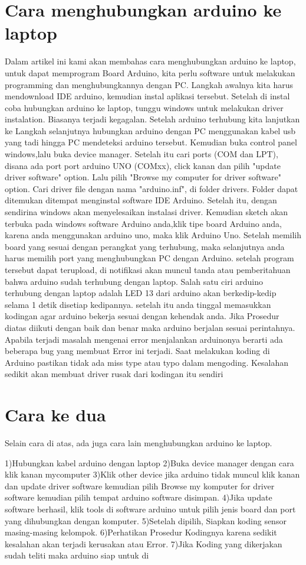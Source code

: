 \section{Cara menghubungkan arduino ke laptop}
Dalam artikel ini kami akan membahas cara menghubungkan arduino ke laptop, untuk dapat memprogram Board Arduino, kita perlu software untuk melakukan programming dan menghubungkannya dengan PC. Langkah awalnya kita harus mendownload IDE arduino, kemudian instal aplikasi tersebut. Setelah di instal coba hubungkan arduino ke laptop, tunggu windows untuk melakukan driver instalation. Biasanya terjadi kegagalan.
Setelah arduino terhubung kita lanjutkan ke Langkah selanjutnya hubungkan arduino dengan PC menggunakan kabel usb yang tadi hingga PC mendeteksi arduino tersebut. Kemudian buka control panel windows,lalu buka device manager. Setelah itu cari ports (COM dan LPT), disana ada port port arduino UNO (COMxx), click kanan dan pilih "update driver software" option.
Lalu pilih "Browse my computer for driver software" option. Cari driver file dengan nama "arduino.inf", di folder drivers. Folder dapat ditemukan ditempat menginstal software IDE Arduino.
Setelah itu, dengan sendirina windows akan menyelesaikan instalasi driver. Kemudian sketch akan terbuka pada windows software Arduino anda,klik tipe board Arduino anda, karena anda menggunakan arduino uno, maka klik Arduino Uno.
Setelah memilih board yang sesuai dengan perangkat yang terhubung, maka selanjutnya anda harus memilih port yang menghubungkan PC dengan Arduino.
setelah program tersebut dapat terupload, di notifikasi akan muncul tanda atau pemberitahuan bahwa arduino sudah terhubung dengan laptop. Salah satu ciri arduino terhubung dengan laptop adalah LED 13 dari arduino akan berkedip-kedip selama 1 detik disetiap kedipannya.
setelah itu anda tinggal memasukkan kodingan agar arduino bekerja sesuai dengan kehendak anda.
Jika Prosedur diatas diikuti dengan baik dan benar maka arduino berjalan sesuai perintahnya.
Apabila terjadi masalah mengenai error menjalankan arduinonya berarti ada beberapa bug yang membuat Error ini terjadi.
Saat melakukan koding di Arduino pastikan tidak ada miss type atau typo dalam mengoding. Kesalahan sedikit akan membuat driver rusak dari kodingan itu sendiri
\section{Cara ke dua}
Selain cara di atas, ada juga cara lain menghubungkan arduino ke laptop.

1)Hubungkan kabel arduino dengan laptop
2)Buka device manager dengan cara klik kanan mycomputer
3)Klik other device jika arduino tidak muncul klik kanan dan update driver software kemudian pilih Browse my komputer for driver software kemudian pilih tempat arduino software disimpan.
4)Jika update software berhasil, klik tools di software arduino untuk pilih jenis board dan port yang dihubungkan dengan komputer.
5)Setelah dipilih, Siapkan koding sensor masing-masing kelompok.
6)Perhatikan Prosedur Kodingnya karena sedikit kesalahan akan terjadi kerusakan atau Error.
7)Jika Koding yang dikerjakan sudah teliti maka arduino siap untuk di

